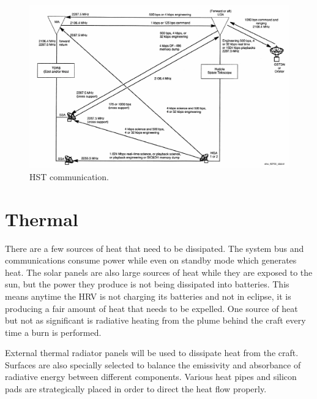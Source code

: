 \documentclass[paper=letter, fontsize=11pt]{scrartcl} %
\numberwithin{equation}{section} %
\numberwithin{figure}{section} %
\numberwithin{table}{section} %
\begin{document}
\begin{figure}[H]
\begin{center}
\includegraphics[width=1\textwidth]{figs/HSTcom.PNG}
\caption{HST communication.}
\end{center}
\end{figure}



\section{Thermal}

There are a few sources of heat that need to be dissipated. The system bus and communications consume power while even on standby mode which generates heat. The solar panels are also large sources of heat while they are exposed to the sun, but the power they produce is not being dissipated into batteries. This means anytime the HRV is not charging its batteries and not in eclipse, it is producing a fair amount of heat that needs to be expelled. One source of heat but not as significant is radiative heating from the plume behind the craft every time a burn is performed.

External thermal radiator panels will be used to dissipate heat from the craft. Surfaces are also specially selected to balance the emissivity and absorbance of radiative energy between different components. Various heat pipes and silicon pads are strategically placed in order to direct the heat flow properly.


\end{document}
